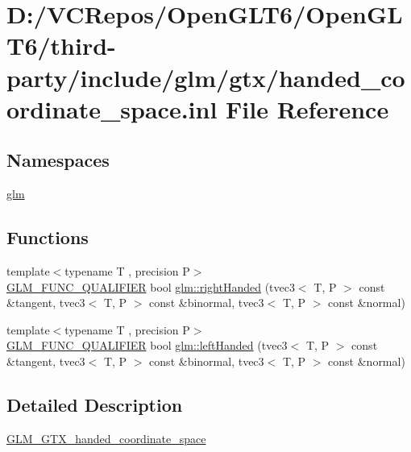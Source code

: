 \hypertarget{handed__coordinate__space_8inl}{}\section{D\+:/\+V\+C\+Repos/\+Open\+G\+L\+T6/\+Open\+G\+L\+T6/third-\/party/include/glm/gtx/handed\+\_\+coordinate\+\_\+space.inl File Reference}
\label{handed__coordinate__space_8inl}
\subsection*{Namespaces}
\begin{DoxyCompactItemize}
\item 
 \mbox{\hyperlink{namespaceglm}{glm}}
\end{DoxyCompactItemize}
\subsection*{Functions}
\begin{DoxyCompactItemize}
\item 
{\footnotesize template$<$typename T , precision P$>$ }\\\mbox{\hyperlink{setup_8hpp_a33fdea6f91c5f834105f7415e2a64407}{G\+L\+M\+\_\+\+F\+U\+N\+C\+\_\+\+Q\+U\+A\+L\+I\+F\+I\+ER}} bool \mbox{\hyperlink{group__gtx__handed__coordinate__space_ga17cd83888de8755c0435c589fafd3603}{glm\+::right\+Handed}} (tvec3$<$ T, P $>$ const \&tangent, tvec3$<$ T, P $>$ const \&binormal, tvec3$<$ T, P $>$ const \&normal)
\item 
{\footnotesize template$<$typename T , precision P$>$ }\\\mbox{\hyperlink{setup_8hpp_a33fdea6f91c5f834105f7415e2a64407}{G\+L\+M\+\_\+\+F\+U\+N\+C\+\_\+\+Q\+U\+A\+L\+I\+F\+I\+ER}} bool \mbox{\hyperlink{group__gtx__handed__coordinate__space_ga7425e0ebfe6a56919900a072ae1f8017}{glm\+::left\+Handed}} (tvec3$<$ T, P $>$ const \&tangent, tvec3$<$ T, P $>$ const \&binormal, tvec3$<$ T, P $>$ const \&normal)
\end{DoxyCompactItemize}


\subsection{Detailed Description}
\mbox{\hyperlink{group__gtx__handed__coordinate__space}{G\+L\+M\+\_\+\+G\+T\+X\+\_\+handed\+\_\+coordinate\+\_\+space}} 